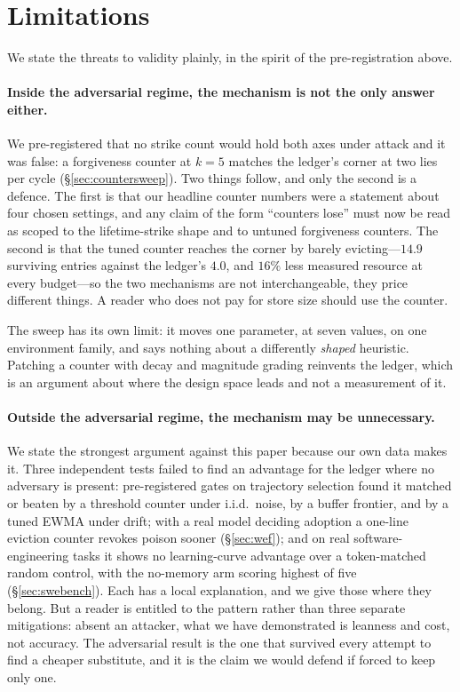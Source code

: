 \section{Limitations}
\label{sec:limitations}

We state the threats to validity plainly, in the spirit of the
pre-registration above.

\paragraph{Inside the adversarial regime, the mechanism is not the only
answer either.} We pre-registered that no strike count would hold both
axes under attack and it was false: a forgiveness counter at $k{=}5$
matches the ledger's corner at two lies per cycle
(\S\ref{sec:countersweep}). Two things follow, and only the second is a
defence. The first is that our headline counter numbers were a statement
about four chosen settings, and any claim of the form ``counters lose''
must now be read as scoped to the lifetime-strike shape and to untuned
forgiveness counters. The second is that the tuned counter reaches the
corner by barely evicting---$14.9$ surviving entries against the
ledger's $4.0$, and $16\%$ less measured resource at every budget---so
the two mechanisms are not interchangeable, they price different things.
A reader who does not pay for store size should use the counter.

The sweep has its own limit: it moves one parameter, at seven values, on
one environment family, and says nothing about a differently
\emph{shaped} heuristic. Patching a counter with decay and magnitude
grading reinvents the ledger, which is an argument about where the design
space leads and not a measurement of it.

\paragraph{Outside the adversarial regime, the mechanism may be
unnecessary.}
We state the strongest argument against this paper because our own data
makes it. Three independent tests failed to find an advantage for the
ledger where no adversary is present: pre-registered gates on trajectory
selection found it matched or beaten by a threshold counter under
i.i.d.\ noise, by a buffer frontier, and by a tuned EWMA under drift;
with a real model deciding adoption a one-line eviction counter revokes
poison sooner (\S\ref{sec:wef}); and on real software-engineering tasks
it shows no learning-curve advantage over a token-matched random control,
with the no-memory arm scoring highest of five (\S\ref{sec:swebench}).
Each has a local explanation, and we give those where they belong. But a
reader is entitled to the pattern rather than three separate mitigations:
absent an attacker, what we have demonstrated is leanness and cost, not
accuracy. The adversarial result is the one that survived every attempt
to find a cheaper substitute, and it is the claim we would defend if
forced to keep only one.

